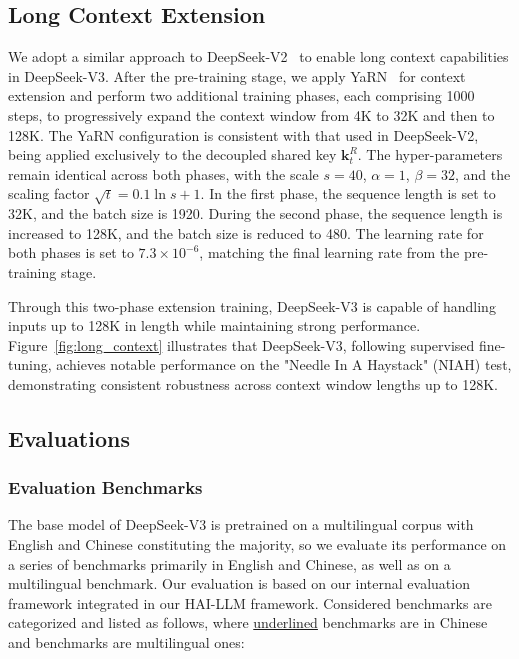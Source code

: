\documentclass[11pt, a4paper, logo, copyright, nonumbering]{deepseek}
\newcommand{\dsvii}{DeepSeek-V2}
\newcommand{\dsviii}{DeepSeek-V3}
\begin{document}
\begin{CJK*}{UTF8}{gbsn}
\subsection{Long Context Extension}

We adopt a similar approach to \dsvii{}~\citep{dsvii} to enable long context capabilities in \dsviii{}. 
After the pre-training stage, we apply YaRN~\citep{peng2023yarn} for context extension and perform two additional training phases, each comprising 1000 steps, to progressively expand the context window from 4K to 32K and then to 128K.
The YaRN configuration is consistent with that used in \dsvii{}, being applied exclusively to the decoupled shared key $\mathbf{k}^R_t$.
The hyper-parameters remain identical across both phases, with the scale $s = 40$, $\alpha = 1$, $\beta = 32$, and the scaling factor $\sqrt{t} = 0.1 \ln{s} + 1$.
In the first phase, the sequence length is set to 32K, and the batch size is 1920. 
During the second phase, the sequence length is increased to 128K, and the batch size is reduced to 480. 
The learning rate for both phases is set to $7.3 \times 10^{-6}$, matching the final learning rate from the pre-training stage.

Through this two-phase extension training, \dsviii{} is capable of handling inputs up to 128K in length while maintaining strong performance. 
Figure~\ref{fig:long_context} illustrates that \dsviii{}, following supervised fine-tuning, achieves notable performance on the "Needle In A Haystack" (NIAH) test, demonstrating consistent robustness across context window lengths up to 128K.

\subsection{Evaluations}

\subsubsection{Evaluation Benchmarks}

The base model of \dsviii{} is pretrained on a multilingual corpus with English and Chinese constituting the majority, so we evaluate its performance on a series of benchmarks primarily in English and Chinese, as well as on a multilingual benchmark.
Our evaluation is based on our internal evaluation framework integrated in our HAI-LLM framework. 
Considered benchmarks are categorized and listed as follows, where \underline{underlined} benchmarks are in Chinese and  benchmarks are multilingual ones:


\end{CJK*}
\end{document}
